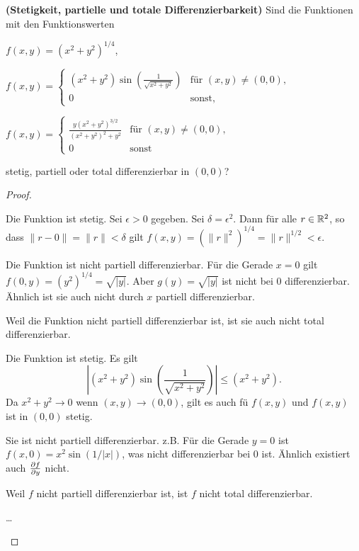\begin{Problem}
	\textbf{(Stetigkeit, partielle und totale Differenzierbarkeit)}	Sind die Funktionen mit den Funktionswerten
	\begin{parts}
		\item $f(x,y)=(x^2+y^2)^{1 / 4}$,
		\item $f(x,y)=\begin{cases}
				(x^2+y^2)\sin\left( \frac{1}{\sqrt{x^2+y^2} } \right) & \text{f\"{u}r }(x,y)\neq (0,0),\\
				0 & \text{sonst,}
		\end{cases}$ 
	\item $f(x,y)=\begin{cases}
			\frac{y(x^2+y^2)^{3 / 2}}{(x^2+y^2)^2+y^2} & \text{f\"{u}r }(x,y)\neq (0,0),\\
			0 & \text{sonst}
	\end{cases}$
	\end{parts}
	stetig, partiell oder total differenzierbar in $(0,0)$?
\end{Problem}
\begin{proof}
	\begin{parts}
	\item Die Funktion ist stetig. Sei $\epsilon>0$ gegeben. Sei $\delta=\epsilon^2$. Dann f\"{u}r alle $r\in \mathbb{R}^2$, so dass $\|r-0\|=\|r\|<\delta$ gilt $f(x,y)=(\|r\|^2)^{1 / 4}=\|r\|^{1 / 2}<\epsilon$.

		Die Funktion ist nicht partiell differenzierbar. F\"{u}r die Gerade $x=0$ gilt $f(0,y)=(y^2)^{1 / 4}=\sqrt{|y|} $. Aber $g(y)=\sqrt{|y|} $ ist nicht bei $0$ differenzierbar. Ähnlich ist sie auch nicht durch $x$ partiell differenzierbar.

		Weil die Funktion nicht partiell differenzierbar ist, ist sie auch nicht total differenzierbar.
	\item Die Funktion ist stetig. Es gilt
		\[
		\left|(x^2+y^2)\sin\left( \frac{1}{\sqrt{x^2+y^2} } \right)  \right| \le (x^2+y^2)
	.\]
	Da $x^2+y^2\to 0$ wenn $(x,y)\to (0,0)$, gilt es auch f\"{u} $f(x,y)$ und $f(x,y)$ ist in $(0,0)$ stetig.

	Sie ist nicht partiell differenzierbar. z.B. F\"{u}r die Gerade $y=0$ ist $f(x,0)=x^2 \sin(1 / |x|)$, was nicht differenzierbar bei $0$ ist. Ähnlich existiert auch $\pdv{f}{y}(0,0)$ nicht. 

	Weil $f$ nicht partiell differenzierbar ist, ist $f$ nicht total differenzierbar.
\item \ldots
	\end{parts}
\end{proof}
